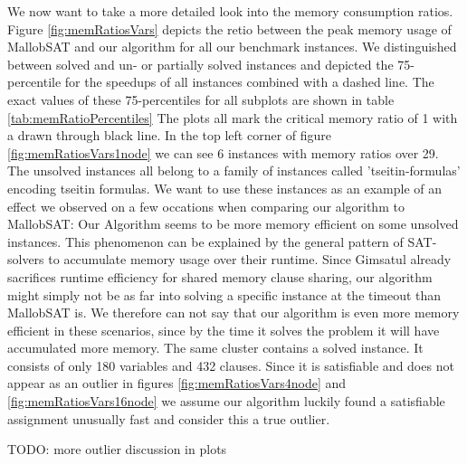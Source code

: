 \documentclass[12pt,a4paper,twoside]{scrartcl}
\numberwithin{equation}{section}
\begin{document}
\label{sec:peakMemRatios}
We now want to take a more detailed look into the memory consumption ratios. Figure \ref{fig:memRatiosVars} depicts the retio between the peak memory usage of MallobSAT and our algorithm for all our benchmark instances. We distinguished between solved and un- or partially solved instances and depicted the 75-percentile for the speedups of all instances combined with a dashed line. The exact values of these 75-percentiles for all subplots are shown in table \ref{tab:memRatioPercentiles} The plots all mark the critical memory ratio of 1 with a drawn through black line.
In the top left corner of figure \ref{fig:memRatiosVars1node} we can see 6 instances with memory ratios over 29. The unsolved instances all belong to a family of instances called 'tseitin-formulas' encoding tseitin formulas. We want to use these instances as an example of an effect we observed on a few occations when comparing our algorithm to MallobSAT: Our Algorithm seems to be more memory efficient on some unsolved instances. This phenomenon can be explained by the general pattern of SAT-solvers to accumulate memory usage over their runtime. Since Gimsatul already sacrifices runtime efficiency for shared memory clause sharing, our algorithm might simply not be as far into solving a specific instance at the timeout than MallobSAT is. We therefore can not say that our algorithm is even more memory efficient in these scenarios, since by the time it solves the problem it will have accumulated more memory.
The same cluster contains a solved instance. It consists of only 180 variables and 432 clauses. Since it is satisfiable and does not appear as an outlier in figures \ref{fig:memRatiosVars4node} and \ref{fig:memRatiosVars16node} we assume our algorithm luckily found a satisfiable assignment unusually fast and consider this a true outlier.

TODO: more outlier discussion in plots
\end{document}
